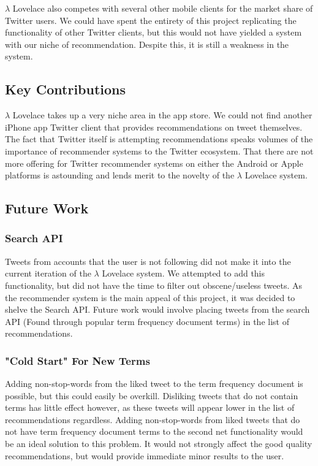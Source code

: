 \documentclass{article}
\begin{document}
$\lambda$ Lovelace also competes with several other mobile clients for the market share of Twitter users. We could have spent the entirety of this project replicating the functionality of other Twitter clients, but this would not have yielded a system with our niche of recommendation. Despite this, it is still a weakness in the system.


\subsection{Key Contributions} 


$\lambda$ Lovelace takes up a very niche area in the app store. We could not find another iPhone app Twitter client that provides recommendations on tweet themselves. The fact that Twitter itself is attempting recommendations speaks volumes of the importance of recommender systems to the Twitter ecosystem. That there are not more offering for Twitter recommender systems on either the Android or Apple platforms is astounding and lends merit to the novelty of the $\lambda$ Lovelace system. 





\subsection{Future Work} 

\subsubsection*{Search API} 
Tweets from accounts that the user is not following did not make it into the current iteration of the $\lambda$ Lovelace system. We attempted to add this functionality, but did not have the time to filter out obscene/useless tweets. As the recommender system is the main appeal of this project, it was decided to shelve the Search API. Future work would involve placing tweets from the search API (Found through popular term frequency document terms) in the list of recommendations.

\subsubsection*{"Cold Start" For New Terms} 
Adding non-stop-words from the liked tweet to the term frequency document is possible, but this could easily be overkill. Disliking tweets that do not contain terms has little effect however, as these tweets will appear lower in the list of recommendations regardless. Adding non-stop-words from liked tweets that do not have term frequency document terms to the second net functionality would be an ideal solution to this problem. It would not strongly affect the good quality recommendations, but would provide immediate minor results to the user. 
\end{document}
